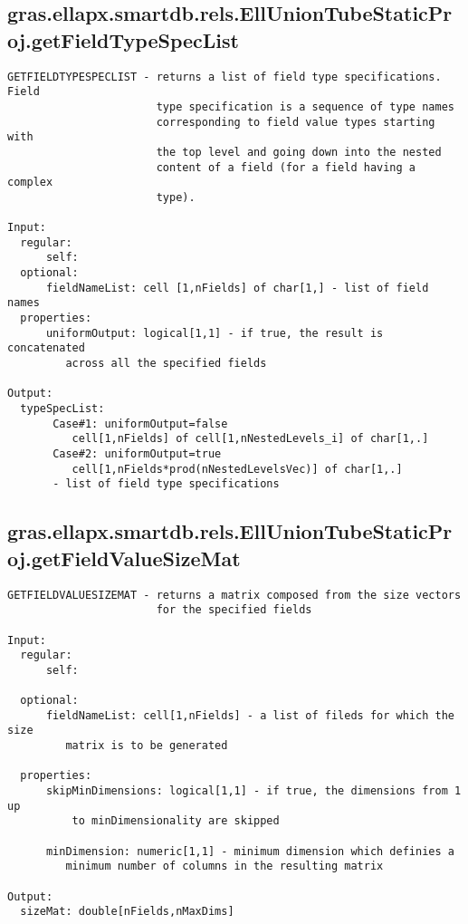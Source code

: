 \subsection{\texorpdfstring{gras.ellapx.smartdb.rels.EllUnionTubeStaticProj.getFieldTypeSpecList}{getFieldTypeSpecList}}\label{method:gras.ellapx.smartdb.rels.EllUnionTubeStaticProj.getFieldTypeSpecList}
\begin{verbatim}
GETFIELDTYPESPECLIST - returns a list of field type specifications. Field
                       type specification is a sequence of type names
                       corresponding to field value types starting with
                       the top level and going down into the nested
                       content of a field (for a field having a complex
                       type).

Input:
  regular:
      self:
  optional:
      fieldNameList: cell [1,nFields] of char[1,] - list of field names
  properties:
      uniformOutput: logical[1,1] - if true, the result is concatenated
         across all the specified fields

Output:
  typeSpecList:
       Case#1: uniformOutput=false
          cell[1,nFields] of cell[1,nNestedLevels_i] of char[1,.]
       Case#2: uniformOutput=true
          cell[1,nFields*prod(nNestedLevelsVec)] of char[1,.]
       - list of field type specifications
\end{verbatim}
\subsection{\texorpdfstring{gras.ellapx.smartdb.rels.EllUnionTubeStaticProj.getFieldValueSizeMat}{getFieldValueSizeMat}}\label{method:gras.ellapx.smartdb.rels.EllUnionTubeStaticProj.getFieldValueSizeMat}
\begin{verbatim}
GETFIELDVALUESIZEMAT - returns a matrix composed from the size vectors
                       for the specified fields

Input:
  regular:
      self:

  optional:
      fieldNameList: cell[1,nFields] - a list of fileds for which the size
         matrix is to be generated

  properties:
      skipMinDimensions: logical[1,1] - if true, the dimensions from 1 up
          to minDimensionality are skipped

      minDimension: numeric[1,1] - minimum dimension which definies a
         minimum number of columns in the resulting matrix

Output:
  sizeMat: double[nFields,nMaxDims]
\end{verbatim}
